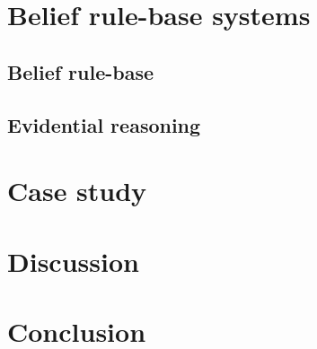 \documentclass[utf8,english]{gradu3}
\begin{document}
\chapter{Belief rule-base systems}

\section{Belief rule-base}


\section{Evidential reasoning}


\chapter{Case study}


\chapter{Discussion}


\chapter{Conclusion}


\printbibliography

\appendix

\end{document}
